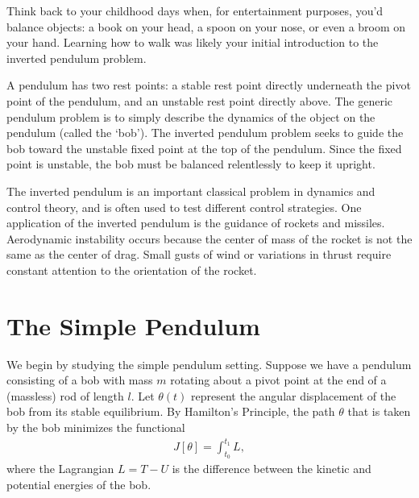 \label{lab:inverted_pendulum}



Think back to your childhood days when, for entertainment purposes, you'd balance objects: a book on your head, a spoon on your nose, or even a broom on your hand.
 Learning how to walk was likely your initial introduction to the inverted pendulum problem.

A pendulum has two rest points: a stable rest point directly underneath the pivot point of the pendulum, and an unstable rest point directly above. 
The generic pendulum problem is to simply describe the dynamics of the object on the pendulum (called the `bob').
The inverted pendulum problem seeks to guide the bob toward the unstable fixed point at the top of the pendulum. 
Since the fixed point is unstable, the bob must be balanced relentlessly to keep it upright. 

The inverted pendulum is an important classical problem in dynamics and control theory, and is often used to test different control strategies. One application of the inverted pendulum is the guidance of rockets and missiles. Aerodynamic instability occurs because the center of mass of the rocket is not the same as the center of drag. Small gusts of wind or variations in thrust require constant attention to the orientation of the rocket. 


\section*{The Simple Pendulum}
We begin by studying the simple pendulum setting. 
Suppose we have a pendulum consisting of a bob with mass $m$ rotating about a pivot point at the end of a (massless) rod of length $l$. 
Let $\theta(t)$ represent the angular displacement of the bob from its stable equilibrium.
By Hamilton's Principle, the path $\theta$ that is taken by the bob minimizes the functional 
\begin{align}
J[\theta] = \int_{t_0}^{t_1}	L,
\end{align}
where the Lagrangian $L = T - U$ is the difference between the kinetic and potential energies of the bob. 

